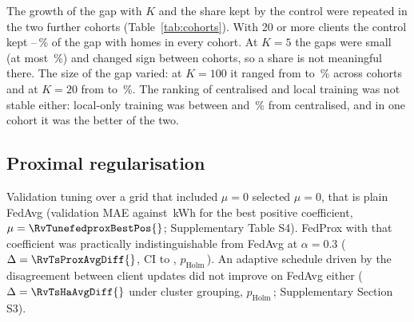 The growth of the gap with $K$ and the share kept by the control were repeated in the two further cohorts
(Table~\ref{tab:cohorts}). With 20 or more clients the control kept \RvCoShareBigLo{}--\RvCoShareBigHi{}\,\% of the gap
with homes in every cohort. At $K=5$ the gaps were small (at most \RvCoHomeKfiveHi{}\,\%) and changed sign between cohorts, so a share is
not meaningful there. The size of the gap varied: at $K=100$ it ranged from \RvCoHomeKhundredLo{} to
\RvCoHomeKhundredHi{}\,\% across cohorts and at $K=20$ from \RvCoHomeKtwentyLo{} to
\RvCoHomeKtwentyHi{}\,\%. The ranking of centralised and local training was not stable either: local-only training
was between \RvCoLocalGapLo{} and \RvCoLocalGapHi{}\,\% from centralised, and in one cohort it was the better of
the two.


\subsection{Proximal regularisation}
Validation tuning over a grid that included $\mu=0$ selected $\mu=0$, that is plain FedAvg (validation MAE
\RvTuneFedAvgVal{} against \RvTunefedproxBestPosVal{}\,kWh for the best positive coefficient, $\mu=\RvTunefedproxBestPos{}$;
Supplementary Table S4). FedProx with that coefficient was practically indistinguishable from FedAvg at $\alpha=0.3$
($\Delta=\RvTsProxAvgDiff{}$, CI \RvTsProxAvgLo{} to \RvTsProxAvgHi{}, $p_{\mathrm{Holm}}$\,\RvTsProxAvgP{}). An adaptive
schedule driven by the disagreement between client updates did not improve on FedAvg either ($\Delta=\RvTsHaAvgDiff{}$
under cluster grouping, $p_{\mathrm{Holm}}$\,\RvTsHaAvgP{}; Supplementary Section S3).

